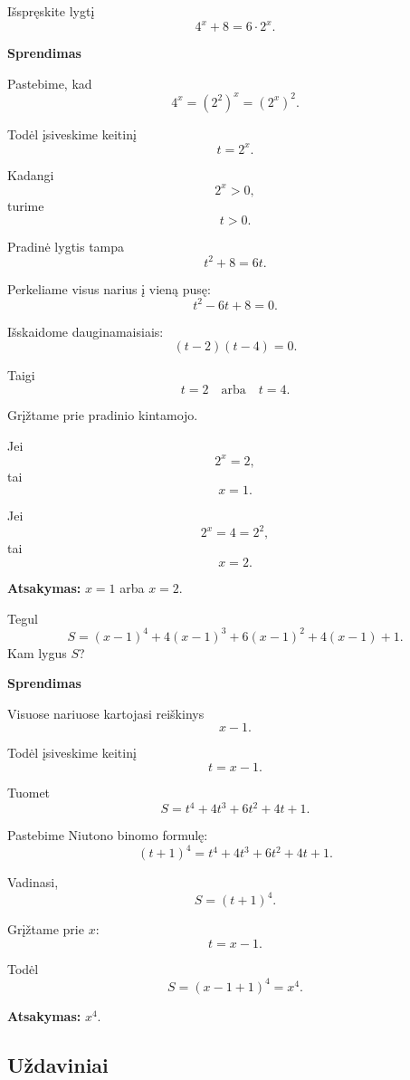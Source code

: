 \documentclass[11pt,a4paper]{scrartcl}
\newenvironment{solution}
    {\begin{list}{}{\setlength{\leftmargin}{10pt}\setlength{\rightmargin}{10pt}}\item[]}
    {\end{list}}
\begin{document}
\begin{example}

Išspręskite lygtį
\[
4^x+8=6\cdot2^x.
\]
\end{example}

\begin{solution}
\textbf{Sprendimas}

Pastebime, kad
\[
4^x=(2^2)^x=(2^x)^2.
\]

Todėl įsiveskime keitinį
\[
t=2^x.
\]

Kadangi
\[
2^x>0,
\]
turime
\[
t>0.
\]

Pradinė lygtis tampa
\[
t^2+8=6t.
\]

Perkeliame visus narius į vieną pusę:
\[
t^2-6t+8=0.
\]

Išskaidome dauginamaisiais:
\[
(t-2)(t-4)=0.
\]

Taigi
\[
t=2
\quad\text{arba}\quad
t=4.
\]

Grįžtame prie pradinio kintamojo.

Jei
\[
2^x=2,
\]
tai
\[
x=1.
\]

Jei
\[
2^x=4=2^2,
\]
tai
\[
x=2.
\]

\textbf{Atsakymas:} $x=1$ arba $x=2$.
\end{solution}

\begin{example}

Tegul
\[
S=(x-1)^4+4(x-1)^3+6(x-1)^2+4(x-1)+1.
\]
Kam lygus $S$?
\end{example}

\begin{solution}
\textbf{Sprendimas}

Visuose nariuose kartojasi reiškinys
\[
x-1.
\]

Todėl įsiveskime keitinį
\[
t=x-1.
\]

Tuomet
\[
S=t^4+4t^3+6t^2+4t+1.
\]

Pastebime Niutono binomo formulę:
\[
(t+1)^4=t^4+4t^3+6t^2+4t+1.
\]

Vadinasi,
\[
S=(t+1)^4.
\]

Grįžtame prie $x$:
\[
t=x-1.
\]

Todėl
\[
S=(x-1+1)^4=x^4.
\]

\textbf{Atsakymas:} $x^4$.
\end{solution}

\subsection{Uždaviniai}
\end{document}
